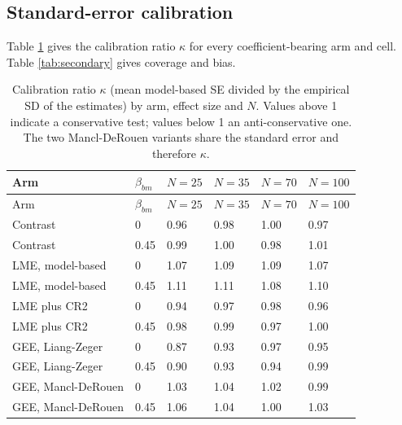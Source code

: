 \documentclass[
  11pt,
]{article}
\begin{document}
\subsection{Standard-error calibration}\label{standard-error-calibration}

Table \ref{tab:kappa} gives the calibration ratio \(\kappa\) for
every coefficient-bearing arm and cell. Table \ref{tab:secondary}
gives coverage and bias.

\begin{longtable}[]{@{}llllll@{}}
\caption{\label{tab:kappa} Calibration ratio \(\kappa\) (mean model-based SE divided by the empirical SD of the estimates) by arm, effect size and \(N\). Values above 1 indicate a conservative test; values below 1 an anti-conservative one. The two Mancl-DeRouen variants share the standard error and therefore \(\kappa\).}\tabularnewline
\toprule\noalign{}
Arm & \(\beta_{bm}\) & \(N = 25\) & \(N = 35\) & \(N = 70\) & \(N = 100\) \\
\midrule\noalign{}
\endfirsthead
\toprule\noalign{}
Arm & \(\beta_{bm}\) & \(N = 25\) & \(N = 35\) & \(N = 70\) & \(N = 100\) \\
\midrule\noalign{}
\endhead
\bottomrule\noalign{}
\endlastfoot
Contrast & 0 & 0.96 & 0.98 & 1.00 & 0.97 \\
Contrast & 0.45 & 0.99 & 1.00 & 0.98 & 1.01 \\
LME, model-based & 0 & 1.07 & 1.09 & 1.09 & 1.07 \\
LME, model-based & 0.45 & 1.11 & 1.11 & 1.08 & 1.10 \\
LME plus CR2 & 0 & 0.94 & 0.97 & 0.98 & 0.96 \\
LME plus CR2 & 0.45 & 0.98 & 0.99 & 0.97 & 1.00 \\
GEE, Liang-Zeger & 0 & 0.87 & 0.93 & 0.97 & 0.95 \\
GEE, Liang-Zeger & 0.45 & 0.90 & 0.93 & 0.94 & 0.99 \\
GEE, Mancl-DeRouen & 0 & 1.03 & 1.04 & 1.02 & 0.99 \\
GEE, Mancl-DeRouen & 0.45 & 1.06 & 1.04 & 1.00 & 1.03 \\
\end{longtable}
\end{document}

